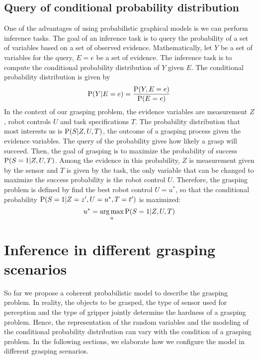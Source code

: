 \subsection{Query of conditional probability distribution}
One of the advantages of using probabilistic graphical models is we can perform inference tasks. The goal of an inference task is to query the probability of a set of variables based on a set of observed evidence. Mathematically, let $Y$ be a set of variables for the query, $E = e$ be a set of evidence. The inference task is to compute the conditional probability  distribution of $Y$ given $E$. The conditional probability distribution is given by 
\begin{equation}
\operatorname*{\text{P}} (Y|E = e) =  \frac{\operatorname*{\text{P}} (Y, E = e)} {\operatorname*{\text{P}} (E = e)}
\end{equation}
In the context of our grasping problem, the evidence variables are measurement $Z$, robot controls $U$ and task specifications $T$. The probability distribution that most interests us is $\operatorname*{\text{P}}(S | Z, U, T) $, the outcome of a grasping process given the evidence variables. The query of the probability gives how likely a grasp will succeed. Then, the goal of grasping is to maximize the probability of success $\operatorname*{\text{P}}(S = 1 | Z, U, T) $. Among the evidence in this probability, $Z$ is measurement given by the sensor and $T$ is given by the task, the only variable that can be changed to maximize the success probability is the robot control $U$. Therefore, the grasping problem is defined by find the best robot control $U = u^*$, so that the conditional probability $\operatorname*{\text{P}}(S = 1 | Z = z', U=u^* , T = t') $ is maximized: 
\begin{equation}
 u^* = \operatorname*{arg\,max}_{u} \operatorname*{\text{P}} (S = 1| Z , U ,T)  
\label{equ:argmax_probS}
\end{equation}

\section{Inference in different grasping scenarios}
So far we propose a coherent probabilistic model to describe the grasping problem. In reality, the objects to be grasped, the type of sensor used for perception and the type of gripper jointly determine the hardness of a grasping problem. Hence, the representation of the random variables and the modeling of the conditional probability distribution can vary with the condition of a grasping problem. In the following sections, we elaborate how we configure the model in different grasping scenarios. 

